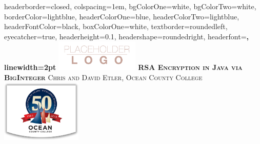 \documentclass[landscape,a0paper,fontscale=.46]{baposter} %
\begin{document}
\begin{poster}
{
headerborder=closed, %
colspacing=1em, %
bgColorOne=white, %
bgColorTwo=white, %
borderColor=lightblue, %
headerColorOne=blue, %
headerColorTwo=lightblue, %
headerFontColor=black, %
boxColorOne=white, %
textborder=roundedleft, %
eyecatcher=true, %
headerheight=0.1\textheight, %
headershape=roundedright, %
headerfont=\Large\bf\textsc, %
linewidth=2pt %
}
%
{\includegraphics[height=4em]{logo.png}} %
{\bf\textsc{RSA Encryption in Java via BigInteger}\vspace{0.5em}} %
{\textsc{ Chris and David Etler,  \hspace{12pt} Ocean County College}} %
{\includegraphics[height=8em]{occ.png}} %


\end{poster}
\end{document}
